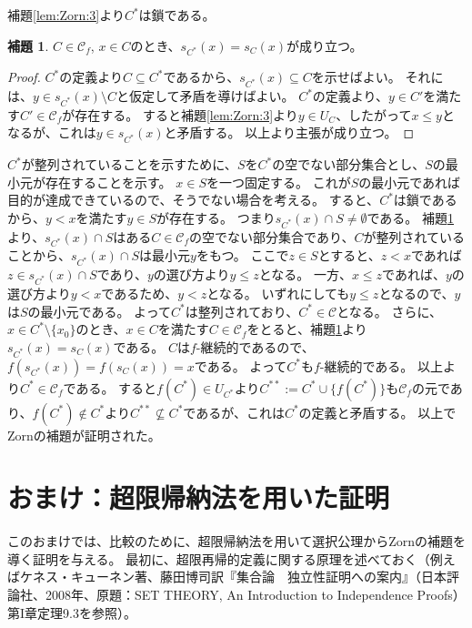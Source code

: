 ﻿\documentclass{ltjsarticle}
\theoremstyle{definition}
\newtheorem{lemma}{補題}
\begin{document}
補題\ref{lem:Zorn:3}より$C^*$は鎖である。

\begin{lemma}
    \label{lem:Zorn:5}
    $C \in \mathcal{C}_f$, $x \in C$のとき、$s_{C^*}(x) = s_C(x)$が成り立つ。
\end{lemma}
\begin{proof}
    $C^*$の定義より$C \subseteq C^*$であるから、$s_{C^*}(x) \subseteq C$を示せばよい。
    それには、$y \in s_{C^*}(x) \setminus C$と仮定して矛盾を導けばよい。
    $C^*$の定義より、$y \in C'$を満たす$C' \in \mathcal{C}_f$が存在する。
    すると補題\ref{lem:Zorn:3}より$y \in U_C$、したがって$x \leq y$となるが、これは$y \in s_{C^*}(x)$と矛盾する。
    以上より主張が成り立つ。
\end{proof}

$C^*$が整列されていることを示すために、$S$を$C^*$の空でない部分集合とし、$S$の最小元が存在することを示す。
$x \in S$を一つ固定する。
これが$S$の最小元であれば目的が達成できているので、そうでない場合を考える。
すると、$C^*$は鎖であるから、$y < x$を満たす$y \in S$が存在する。
つまり$s_{C^*}(x) \cap S \neq \emptyset$である。
補題\ref{lem:Zorn:5}より、$s_{C^*}(x) \cap S$はある$C \in \mathcal{C}_f$の空でない部分集合であり、$C$が整列されていることから、$s_{C^*}(x) \cap S$は最小元$y$をもつ。
ここで$z \in S$とすると、$z < x$であれば$z \in s_{C^*}(x) \cap S$であり、$y$の選び方より$y \leq z$となる。
一方、$x \leq z$であれば、$y$の選び方より$y < x$であるため、$y < z$となる。
いずれにしても$y \leq z$となるので、$y$は$S$の最小元である。
よって$C^*$は整列されており、$C^* \in \mathcal{C}$となる。
さらに、$x \in C^* \setminus \{x_0\}$のとき、$x \in C$を満たす$C \in \mathcal{C}_f$をとると、補題\ref{lem:Zorn:5}より$s_{C^*}(x) = s_C(x)$である。
$C$は$f$-継続的であるので、$f(s_{C^*}(x)) = f(s_C(x)) = x$である。
よって$C^*$も$f$-継続的である。
以上より$C^* \in \mathcal{C}_f$である。
すると$f(C^*) \in U_{C^*}$より$C^{**} := C^* \cup \{f(C^*)\}$も$\mathcal{C}_f$の元であり、$f(C^*) \not\in C^*$より$C^{**} \not\subseteq C^*$であるが、これは$C^*$の定義と矛盾する。
以上でZornの補題が証明された。


\section*{おまけ：超限帰納法を用いた証明}

このおまけでは、比較のために、超限帰納法を用いて選択公理からZornの補題を導く証明を与える。
最初に、超限再帰的定義に関する原理を述べておく（例えばケネス・キューネン著、藤田博司訳『集合論　独立性証明への案内』（日本評論社、2008年、原題：SET THEORY, An Introduction to Independence Proofs）第I章定理9.3を参照）。
\end{document}
